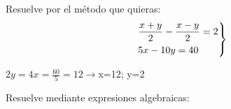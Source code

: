 \documentclass[addpoints,spanish, 12pt,a4paper]{exam}
\begin{document}
\begin{questions}



\question[1] Resuelve por el método que quieras:
$$\left. \begin{gathered}
	  \frac{{x + y}}{2} - \frac{{x - y}}{2} = 2 \hfill \\
	  5x - 10y = 40 \hfill \\ 
	\end{gathered}  \right\rbrace$$
	\begin{solution}  $2y=4 x=\frac{60}{5}=12 \to $x=12; y=2 \end{solution}
	

\question Resuelve mediante expresiones algebraicas:
\begin{parts}

\end{parts}
\end{questions}
\end{document}
